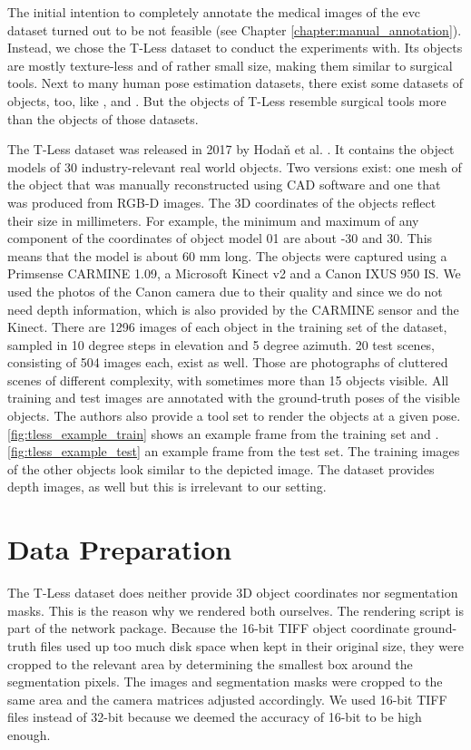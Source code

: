 The initial intention to completely annotate the medical images of the \ac{evc} dataset turned out to be not feasible (see Chapter \ref{chapter:manual_annotation}). Instead, we chose the T-Less dataset to conduct the experiments with. Its objects are mostly texture-less  and of rather small size, making them similar to surgical tools. Next to many human pose estimation datasets, there exist some datasets of objects, too, like \cite{next_view_dataset}, \cite{pracsys_dataset} and \cite{rigid_body_dataset}. But the objects of T-Less resemble surgical tools more than the objects of those datasets.

The T-Less dataset was released in 2017 by Hoda\v{n} et al. \cite{tless}. It contains the object models of 30 industry-relevant real world objects. Two versions exist: one mesh of the object that was manually reconstructed using CAD software and one that was produced from RGB-D images. The 3D coordinates of the objects reflect their size in millimeters. For example, the minimum and maximum of any component of the coordinates of object model 01 are about -30 and 30. This means that the model is about 60 mm long. The objects were captured using a Primsense CARMINE 1.09, a Microsoft Kinect v2 and a Canon IXUS 950 IS. We used the photos of the Canon camera due to their quality and since we do not need depth information, which is also provided by the CARMINE sensor and the Kinect. There are 1296 images of each object in the training set of the dataset, sampled in 10 degree steps in elevation and 5 degree azimuth. 20 test scenes, consisting of 504 images each, exist as well. Those are photographs of cluttered scenes of different complexity, with sometimes more than 15 objects visible. All training and test images are annotated with the ground-truth poses of the visible objects. The authors also provide a tool set to render the objects at a given pose. \fig \ref{fig:tless_example_train} shows an example frame from the training set and \fig. \ref{fig:tless_example_test} an example frame from the test set. The training images of the other objects look similar to the depicted image. The dataset provides depth images, as well but this is irrelevant to our setting.

\section{Data Preparation}

The T-Less dataset does neither provide 3D object coordinates nor segmentation masks. This is the reason why we rendered both ourselves. The rendering script is part of the network package. Because the 16-bit TIFF object coordinate ground-truth files used up too much disk space when kept in their original size, they were cropped to the relevant area by determining the smallest box around the segmentation pixels. The images and segmentation masks were cropped to the same area and the camera matrices adjusted accordingly. We used 16-bit TIFF files instead of 32-bit because we deemed the accuracy of 16-bit to be high enough.

